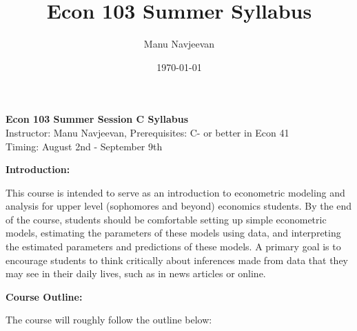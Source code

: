 \documentclass[10pt]{article}
\title{Econ 103 Summer Syllabus}%
\author{Manu Navjeevan}
\date{\today}
\begin{document}
\maketitle

{\bf \Large Econ 103 Summer Session C Syllabus}\\{\small Instructor: Manu Navjeevan, Prerequisites: C- or better in Econ 41 \\ Timing: August 2nd - September 9th} 


{\bf \large Introduction:}

This course is intended to serve as an introduction to econometric modeling and analysis for upper level (sophomores and beyond) economics students. By the end of the course, students should be comfortable setting up simple econometric models, estimating the parameters of these models using data, and interpreting the estimated parameters and predictions of these models. A primary goal is to encourage students to think critically about inferences made from data that they may see in their daily lives, such as in news articles or online.

{\bf \large Course Outline:}

The course will roughly follow the outline below: 
\end{document}
